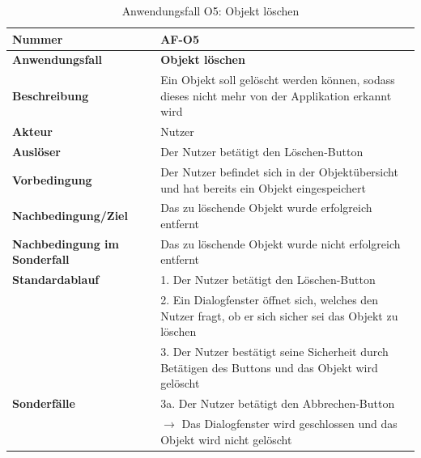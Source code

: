 \documentclass[oneside]{ausarbeitung}
\begin{document}
\begin{table}[htbp]
	\centering
	\begin{tabular}{|l|p{80mm}|}
		\hline
		\textbf{Nummer} & \textbf{AF-O5} \\ \hline
		\textbf{Anwendungsfall} & \textbf{Objekt löschen} \\ \hline
		\textbf{Beschreibung} & Ein Objekt soll gelöscht werden können, sodass dieses nicht mehr von der Applikation erkannt wird \\ \hline
		\textbf{Akteur} & Nutzer \\ \hline
		\textbf{Auslöser} & Der Nutzer betätigt den \glqq Löschen\grqq-Button   \\ \hline
		\textbf{Vorbedingung} & Der Nutzer befindet sich in der Objektübersicht und hat bereits ein Objekt eingespeichert  \\ \hline	
		\textbf{Nachbedingung/Ziel} & Das zu löschende Objekt wurde erfolgreich entfernt \\ \hline
		\textbf{Nachbedingung im Sonderfall} & Das zu löschende Objekt wurde nicht erfolgreich entfernt \\ \hline
		\textbf{Standardablauf} & 1. Der Nutzer betätigt den \glqq Löschen\grqq-Button \\ 
		& 2. Ein Dialogfenster öffnet sich, welches den Nutzer fragt, ob er sich sicher sei das Objekt zu löschen \\
		& 3. Der Nutzer bestätigt seine Sicherheit durch Betätigen des Buttons und das Objekt wird gelöscht \\ \hline
		\textbf{Sonderfälle} & 3a. Der Nutzer betätigt den \glqq Abbrechen\grqq-Button\\ & $\rightarrow$ Das Dialogfenster wird geschlossen und das Objekt wird nicht gelöscht \\ \hline
		
	\end{tabular}
	\caption{Anwendungsfall O5: Objekt löschen}
	\label{tab:use-case-delete-object}
\end{table}
\end{document}
